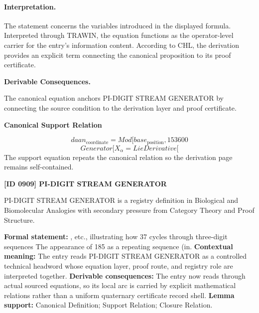 \paragraph{Interpretation.}
The statement concerns the variables introduced in the displayed formula. Interpreted through TRAWIN, the equation functions as the operator-level carrier for the entry’s information content. According to CHL, the derivation provides an explicit term connecting the canonical proposition to its proof certificate.

\par\vspace{0.35em}
\noindent\textbf{Derivable Consequences.}\quad
\begingroup
\footnotesize
\raggedright
The canonical equation anchors PI-DIGIT STREAM GENERATOR by connecting the source condition to the derivation layer and proof certificate.
\par\endgroup

\noindent\textbf{Canonical Support Relation}\par
\[
daan_{\mathrm{coordinate}} = Mod[base_{\mathrm{position}}, 153600
\]
\[
Generator[X_\alpha = LieDerivative[
\]
\noindent The support equation repeats the canonical relation so the derivation page remains self-contained.\par

\clearpage
\noindent\textbf{[ID 0909] PI-DIGIT STREAM GENERATOR}\par
\vspace{0.35em}
\begingroup\small
{}
PI-DIGIT STREAM GENERATOR is a registry definition in Biological and Biomolecular Analogies with secondary pressure from Category Theory and Proof Structure.

\begingroup\footnotesize\setlength{\emergencystretch}{3em}\sloppy
\textbf{Formal statement:} , etc., illustrating how 37 cycles through three-digit sequences The appearance of 185 as a repeating sequence (in. \textbf{Contextual meaning:} The entry reads PI-DIGIT STREAM GENERATOR as a controlled technical headword whose equation layer, proof route, and registry role are interpreted together. \textbf{Derivable consequences:} The entry now reads through actual sourced equations, so its local arc is carried by explicit mathematical relations rather than a uniform quaternary certificate record shell. \textbf{Lemma support:} Canonical Definition; Support Relation; Closure Relation.\par
\endgroup

